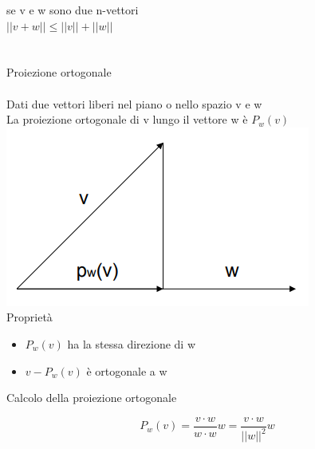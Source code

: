 \documentclass{article}
\begin{document}
se v e w sono due n-vettori\\
\(\lvert\lvert v + w \rvert\rvert \leq \lvert\lvert v \rvert\rvert + \lvert\lvert w \rvert\rvert\)\\\\\\ 
{\Large Proiezione ortogonale}\\\\
Dati due vettori liberi nel piano o nello spazio v e w\\
La proiezione ortogonale di v lungo il vettore w è \(P_w(v)\)\\
\includegraphics[scale=0.5]{prort.png}\\
Proprietà
\begin{itemize}
    \item \(P_w(v)\) ha la stessa direzione di w
    \item \(v - P_w(v)\) è ortogonale a w
\end{itemize}
\begin{center}
    {\large Calcolo della proiezione ortogonale}
\end{center}
\[P_w(v) = \frac{v\cdot w}{w\cdot w} w = \frac{v \cdot w}{\lvert\lvert w \rvert\rvert^2} w\]\\
\end{document}
